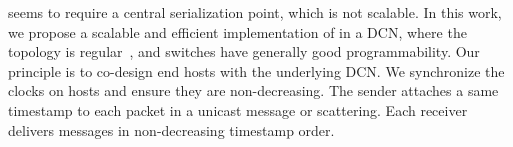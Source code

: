 


\sys{} seems to require a central serialization point, which is not scalable.
In this work, we propose a scalable and efficient implementation of \sys{} in a DCN, where the topology is regular~\cite{leiserson1985fat,greenberg2009vl2}, and switches have generally good programmability.
Our principle is to co-design end hosts with the underlying DCN.
We synchronize the clocks on hosts and ensure they are non-decreasing.
The sender attaches a same timestamp to each packet in a unicast message or scattering.
Each receiver delivers messages in non-decreasing timestamp order.


